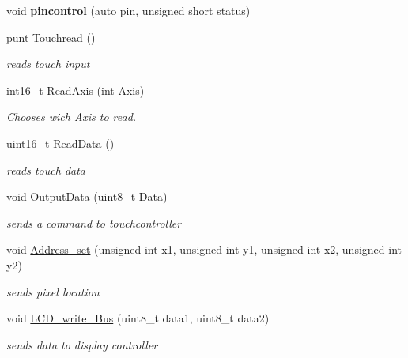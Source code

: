 \begin{DoxyCompactItemize}
\mbox{\label{classdisplay_a0bdd9b4e66175b07c5bdd303504c0da4}} 
void {\bfseries pincontrol} (auto pin, unsigned short status)
\item 
\hyperlink{classpunt}{punt} \hyperlink{classdisplay_a7e3b873f8b5fbd55cbe65862c18374b3}{Touchread} ()
\begin{DoxyCompactList}\small\item\em reads touch input \end{DoxyCompactList}\item 
int16\+\_\+t \hyperlink{classdisplay_ac198f10fa30850e9e3fa71b0dc0c1d73}{Read\+Axis} (int Axis)
\begin{DoxyCompactList}\small\item\em Chooses wich Axis to read. \end{DoxyCompactList}\item 
uint16\+\_\+t \hyperlink{classdisplay_a701815d7bc53a0eea5f3fd2e020c36ae}{Read\+Data} ()
\begin{DoxyCompactList}\small\item\em reads touch data \end{DoxyCompactList}\item 
void \hyperlink{classdisplay_a3da84c7e17070441111af326cc03217a}{Output\+Data} (uint8\+\_\+t Data)
\begin{DoxyCompactList}\small\item\em sends a command to touchcontroller \end{DoxyCompactList}\item 
void \hyperlink{classdisplay_ade81aa04a5c49aaf7a663b7e03ca5a36}{Address\+\_\+set} (unsigned int x1, unsigned int y1, unsigned int x2, unsigned int y2)
\begin{DoxyCompactList}\small\item\em sends pixel location \end{DoxyCompactList}\end{DoxyCompactItemize}
\textbf{ }\par
\begin{DoxyCompactItemize}
\item 
void \hyperlink{classdisplay_a11803b9582f7336d28f2dc69be19bcfe}{L\+C\+D\+\_\+write\+\_\+\+Bus} (uint8\+\_\+t data1, uint8\+\_\+t data2)
\begin{DoxyCompactList}\small\item\em sends data to display controller \end{DoxyCompactList}\end{DoxyCompactItemize}


